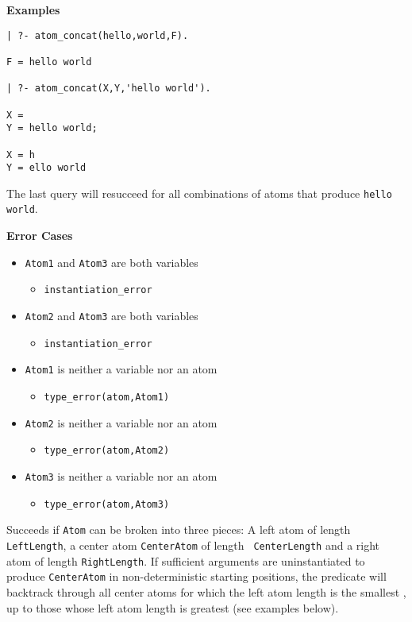 \begin{description}
{\bf Examples}
{\small
\begin{verbatim}
| ?- atom_concat(hello,world,F).

F = hello world

| ?- atom_concat(X,Y,'hello world').

X =
Y = hello world;

X = h
Y = ello world 
\end{verbatim}
}
The last query will resucceed for all combinations of atoms that
produce {\tt hello world}.

{\bf Error Cases}
\begin{itemize}
  \item {\tt Atom1} and {\tt Atom3} are both variables
\begin{itemize}
\item {\tt instantiation\_error}
\end{itemize}
  \item {\tt Atom2} and {\tt Atom3} are both variables
\begin{itemize}
\item {\tt instantiation\_error}
\end{itemize}
\item {\tt Atom1} is neither a variable nor an atom
\begin{itemize}      
\item   {\tt type\_error(atom,Atom1)}
\end{itemize}
\item {\tt Atom2} is neither a variable nor an atom
\begin{itemize}      
\item   {\tt type\_error(atom,Atom2)}
\end{itemize}
\item {\tt Atom3} is neither a variable nor an atom
\begin{itemize}      
\item   {\tt type\_error(atom,Atom3)}
\end{itemize}
\end{itemize}

%
Succeeds if {\tt Atom} can be broken into three pieces: A left atom of
length {\tt LeftLength}, a center atom {\tt CenterAtom} of length {\tt
  CenterLength} and a right atom of length {\tt RightLength}.  If
sufficient arguments are uninstantiated to produce {\tt CenterAtom} in
non-deterministic starting positions, the predicate will backtrack
through all center atoms for which the left atom length is the
smallest , up to those whose left atom length is greatest (see
examples below).


\end{description}
